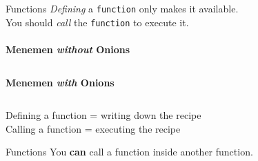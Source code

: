         \begin{frame}{Functions}
            \LARGE
            \textit{Defining} a \texttt{function} only makes it available.\\
            \pause 
            You should \textit{call} the \texttt{function} to execute it.\\    
            \pause
            \\
            \large
            \textbf{Menemen \textit{without} Onions}
            \inputminted[firstline=32, lastline=33, frame=single,framesep=2pt]{python3}{code-examples/menemen.py}
            \pause
            \textbf{Menemen \textit{with} Onions}
            \inputminted[firstline=35, lastline=38, frame=single,framesep=2pt]{python3}{code-examples/menemen.py}
            \begin{center}
            Defining a function = writing down the recipe\\
            Calling a function = executing the recipe
            \end{center}
        \end{frame}
    
        \begin{frame}{Functions}
            \LARGE
            You \textbf{can} call a function inside another function.\\
            \pause 
            \large
            \inputminted[firstline=22, lastline=24, frame=single,framesep=2pt]{python3}{code-examples/menemen.py}
            \pause
            \inputminted[firstline=26, lastline=30, frame=single,framesep=2pt]{python3}{code-examples/menemen.py}
        \end{frame}

